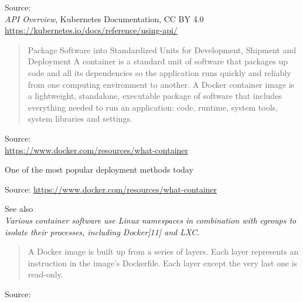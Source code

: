 \documentclass[Screen16to9,17pt]{foils}
\begin{document}
Source: {\footnotesize\\
\emph{API Overview}, Kubernetes Documentation, CC BY 4.0
\url{https://kubernetes.io/docs/reference/using-api/}}





\begin{quote}
  Package Software into Standardized Units for Development, Shipment and Deployment
  A container is a standard unit of software that packages up code and all its dependencies so the application runs quickly and reliably from one computing environment to another. A Docker container image is a lightweight, standalone, executable package of software that includes everything needed to run an application: code, runtime, system tools, system libraries and settings.
\end{quote}
Source: \\{\footnotesize
\url{https://www.docker.com/resources/what-container}}

\begin{list2}
  \item One of the most popular deployment methods today
\end{list2}



Source: {\footnotesize
\url{https://www.docker.com/resources/what-container}}

\begin{list2}
  \item See also \\
   \emph{Various container software use Linux namespaces in combination with cgroups to isolate their processes, including Docker[11] and LXC.}
\end{list2}



\begin{quote}
A Docker image is built up from a series of layers. Each layer represents an instruction in the image’s Dockerfile. Each layer except the very last one is read-only.
\end{quote}

Source: {\footnotesize
{}}






\slidenext{}
\end{document}
